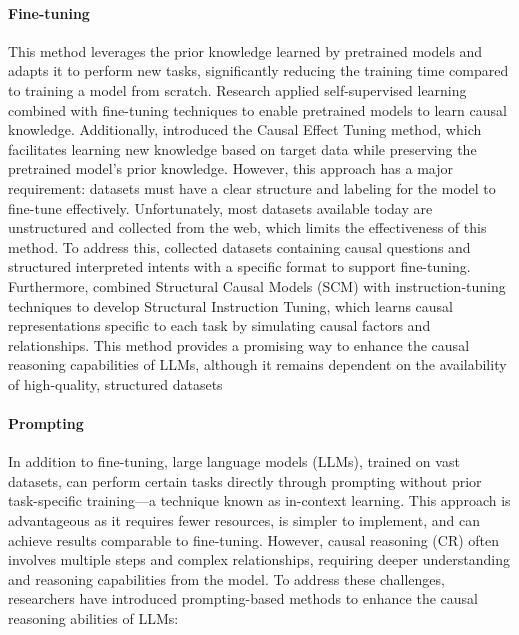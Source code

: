 \paragraph{Fine-tuning} This method leverages the prior knowledge learned by pretrained models and adapts it to perform new tasks, significantly reducing the training time compared to training a model from scratch.
Research \cite{li2021causalbert} applied self-supervised learning combined with fine-tuning techniques to enable pretrained models to learn causal knowledge. Additionally, \cite{zheng2023preserving} introduced the Causal Effect Tuning method, which facilitates 
learning new knowledge based on target data while preserving the pretrained model's prior knowledge.
However, this approach has a major requirement: datasets must have a clear structure and labeling for the model to fine-tune effectively. Unfortunately, most datasets available today are unstructured and collected from the web, which limits the effectiveness of this method.
To address this, \cite{jiang2023large} collected datasets containing causal questions and structured interpreted intents with a specific format to support fine-tuning. Furthermore, \cite{chen2024unified} combined Structural Causal Models (SCM) with instruction-tuning techniques to develop
Structural Instruction Tuning, which learns causal representations specific to each task by simulating causal factors and relationships.
This method provides a promising way to enhance the causal reasoning capabilities of LLMs, although it remains dependent on the availability of high-quality, structured datasets

\paragraph{Prompting} In addition to fine-tuning, large language models (LLMs), trained on vast datasets, can perform certain tasks directly through prompting without prior task-specific training—a technique known as in-context learning. This approach is advantageous as it requires fewer resources, is simpler to implement, and can achieve results comparable to fine-tuning.
However, causal reasoning (CR) often involves multiple steps and complex relationships, requiring deeper understanding and reasoning capabilities from the model. To address these challenges, researchers have introduced prompting-based methods to enhance the causal reasoning abilities of LLMs:

